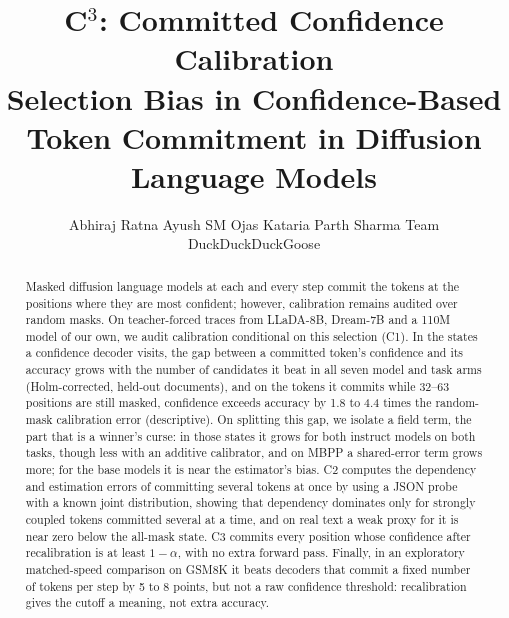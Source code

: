 \documentclass[11pt]{article}
\title{C$^3$: Committed Confidence Calibration\\
  Selection Bias in Confidence-Based Token Commitment in Diffusion Language Models}
\author{Abhiraj Ratna \And Ayush SM \And Ojas Kataria \And Parth Sharma \AND
  \mdseries Team DuckDuckDuckGoose}
\begin{document}
\maketitle

\begin{abstract}
Masked diffusion language models at each and every step commit the tokens at the positions where they are most confident; however, calibration remains audited over random masks. On teacher-forced traces from LLaDA-8B, Dream-7B and a 110M model of our own, we
audit calibration conditional on this selection (C1). In the states a confidence decoder
visits, the gap between a committed token's confidence and its accuracy grows with the number
of candidates it beat in all seven model and task arms (Holm-corrected, held-out documents),
and on the tokens it commits while 32--63 positions are still masked, confidence exceeds
accuracy by 1.8 to 4.4 times the random-mask calibration error (descriptive).
On splitting this gap, we isolate a field term, the part that is a winner's curse: in those states it grows for both instruct models on both tasks, though less with an additive calibrator, and on MBPP a shared-error term grows more; for the base models it is near the estimator's bias.
C2 computes the dependency and estimation errors of committing several tokens at once
by using a JSON probe with a known joint distribution, showing that dependency dominates
only for strongly coupled tokens committed several at a time, and on real text a weak proxy for it is near zero below the all-mask state.
C3 commits every position whose confidence after recalibration is at least $1-\alpha$, with no extra forward pass.
Finally, in an exploratory matched-speed comparison on GSM8K it beats decoders that commit a fixed number of tokens per step by 5 to 8 points, but not a raw confidence threshold: recalibration gives the cutoff a meaning, not extra accuracy.
\end{abstract}
\end{document}
